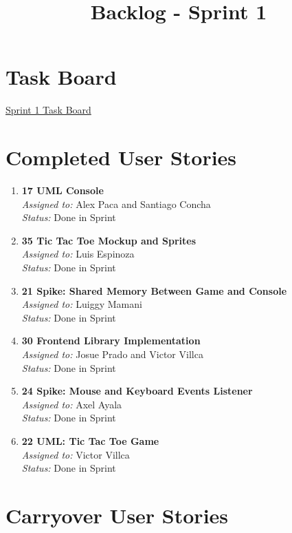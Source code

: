 \documentclass{article}
\begin{document}
\title{Backlog - Sprint 1}
\author{}
\date{}
\maketitle

\section*{Task Board}
\href{https://tree.taiga.io/project/joseluis-teran-coffeetime/taskboard/sprint-1-9301}{Sprint 1 Task Board}


\section*{Completed User Stories}

\begin{enumerate}
    \item \textbf{17 UML Console} \\
    \textit{Assigned to:} Alex Paca and Santiago Concha \\
    \textit{Status:} Done in Sprint
    \item \textbf{35 Tic Tac Toe Mockup and Sprites} \\
    \textit{Assigned to:} Luis Espinoza \\
    \textit{Status:} Done in Sprint
    \item \textbf{21 Spike: Shared Memory Between Game and Console} \\
    \textit{Assigned to:} Luiggy Mamani \\
    \textit{Status:} Done in Sprint
    \item \textbf{30 Frontend Library Implementation} \\
    \textit{Assigned to:} Josue Prado and Victor Villca\\
    \textit{Status:} Done in Sprint
    \item \textbf{24 Spike: Mouse and Keyboard Events Listener} \\
    \textit{Assigned to:} Axel Ayala \\
    \textit{Status:} Done in Sprint
    \item \textbf{22 UML: Tic Tac Toe Game} \\
    \textit{Assigned to:} Victor Villca\\
    \textit{Status:} Done in Sprint
\end{enumerate}

\section*{Carryover User Stories}
\end{document}
